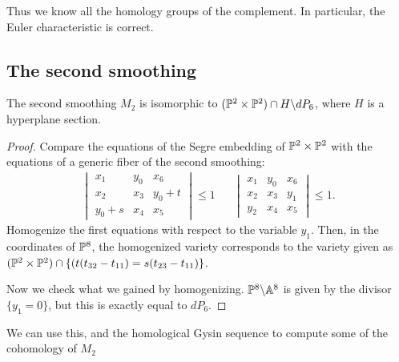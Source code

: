 \documentclass[11pt, english]{article}
\begin{document}
Thus we know all the homology groups of the complement. In particular, the Euler characteristic is correct.

\subsection{The second smoothing}

\begin{prop}
The second smoothing $M_2$ is isomorphic to $(\mathbb{P}^2 \times \mathbb{P}^2) \cap H \backslash dP_6$, where $H$ is a hyperplane section.
\end{prop}
\begin{proof}
Compare the equations of the Segre embedding of $\mathbb{P}^2 \times \mathbb{P}^2$ with the equations of a generic fiber of the second smoothing:
\begin{align*}
\begin{vmatrix}
x_1 & y_0 & x_6 \\
x_2 & x_3 & y_0+t \\
y_0+s & x_4 & x_5
\end{vmatrix} \le 1
&&
\begin{vmatrix}
x_1 & y_0 & x_6 \\
x_2 & x_3 & y_1 \\
y_2 & x_4 & x_5
\end{vmatrix} \le 1.
\end{align*}
Homogenize the first equations with respect to the variable $y_1$. Then, in the coordinates of $\mathbb{P}^8$, the homogenized variety corresponds to the variety given as $(\mathbb{P}^2 \times \mathbb{P}^2) \cap \{ (t(t_{32}-t_{11})=s(t_{23}-t_{11}) \}$.

Now we check what we gained by homogenizing. $\mathbb{P}^8 \backslash \mathbb{A}^8$ is given by the divisor $\{ y_1 = 0 \}$, but this is exactly equal to $dP_6$.
\end{proof}

We can use this, and the homological Gysin sequence to compute some of the cohomology of $M_2$






\end{document}
